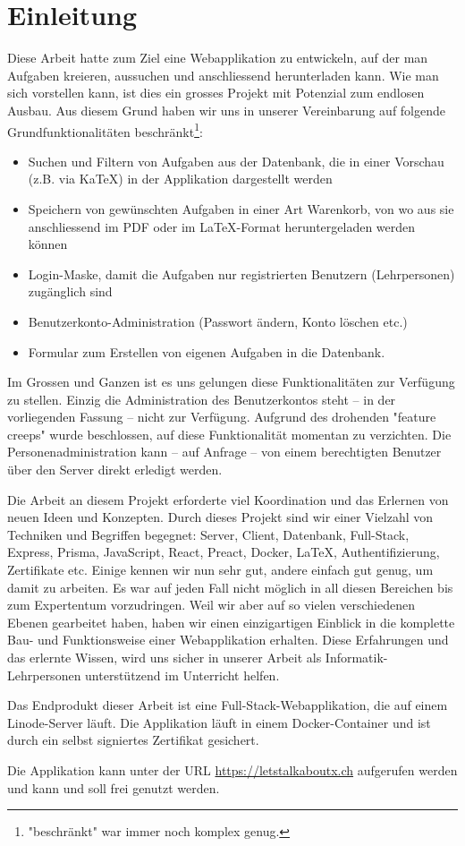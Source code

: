 
\section{Einleitung}

Diese Arbeit hatte zum Ziel eine Webapplikation zu entwickeln, auf der man Aufgaben kreieren, aussuchen und anschliessend herunterladen kann. Wie man sich vorstellen kann, ist dies ein grosses Projekt mit Potenzial zum endlosen Ausbau. Aus diesem Grund haben wir uns in unserer Vereinbarung auf folgende Grundfunktionalitäten beschränkt\footnote{"beschränkt" war immer noch komplex genug.}:
\begin{itemize}
  \item Suchen und Filtern von Aufgaben aus der Datenbank, die in einer Vorschau (z.B. via KaTeX) in der Applikation dargestellt werden
  \item Speichern von gewünschten Aufgaben in einer Art Warenkorb, von wo aus sie anschliessend im PDF oder im LaTeX-Format heruntergeladen werden können
  \item Login-Maske, damit die Aufgaben nur registrierten Benutzern (Lehrpersonen) zugänglich sind
  \item Benutzerkonto-Administration (Passwort ändern, Konto löschen etc.)
  \item Formular zum Erstellen von eigenen Aufgaben in die Datenbank.
\end{itemize}

Im Grossen und Ganzen ist es uns gelungen diese Funktionalitäten zur Verfügung zu stellen. Einzig die Administration des Benutzerkontos steht -- in der vorliegenden Fassung -- nicht zur Verfügung. Aufgrund des drohenden "feature creeps" wurde beschlossen, auf diese Funktionalität momentan zu verzichten. Die Personenadministration kann -- auf Anfrage -- von einem berechtigten Benutzer über den Server direkt erledigt werden.

Die Arbeit an diesem Projekt erforderte viel Koordination und das Erlernen von neuen Ideen und Konzepten.  Durch dieses Projekt sind wir einer Vielzahl von Techniken und Begriffen begegnet: Server, Client, Datenbank, Full-Stack, Express, Prisma, JavaScript, React, Preact, Docker, \LaTeX, Authentifizierung, Zertifikate etc. Einige kennen wir nun sehr gut, andere einfach gut genug, um damit zu arbeiten. Es war auf jeden Fall nicht möglich in all diesen Bereichen bis zum Expertentum vorzudringen. Weil wir aber auf so vielen verschiedenen Ebenen gearbeitet haben, haben wir einen einzigartigen Einblick in die komplette Bau- und Funktionsweise einer Webapplikation erhalten. Diese Erfahrungen und das erlernte Wissen, wird uns sicher in unserer Arbeit als Informatik-Lehrpersonen unterstützend im Unterricht helfen.

Das Endprodukt dieser Arbeit ist eine Full-Stack-Webapplikation, die auf einem Linode-Server läuft. Die Applikation läuft in einem Docker-Container und ist durch ein selbst signiertes Zertifikat gesichert.

Die Applikation kann unter der URL \url{https://letstalkaboutx.ch} aufgerufen werden und kann und soll frei genutzt werden.